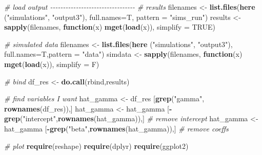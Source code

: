 \documentclass[
]{article}
\newenvironment{Shaded}{\begin{snugshade}}{\end{snugshade}}
\newcommand{\AttributeTok}[1]{\textcolor[rgb]{0.13,0.29,0.53}{#1}}
\newcommand{\CommentTok}[1]{\textcolor[rgb]{0.56,0.35,0.01}{\textit{#1}}}
\newcommand{\ConstantTok}[1]{\textcolor[rgb]{0.56,0.35,0.01}{#1}}
\newcommand{\ControlFlowTok}[1]{\textcolor[rgb]{0.13,0.29,0.53}{\textbf{#1}}}
\newcommand{\FunctionTok}[1]{\textcolor[rgb]{0.13,0.29,0.53}{\textbf{#1}}}
\newcommand{\NormalTok}[1]{#1}
\newcommand{\OtherTok}[1]{\textcolor[rgb]{0.56,0.35,0.01}{#1}}
\newcommand{\SpecialCharTok}[1]{\textcolor[rgb]{0.81,0.36,0.00}{\textbf{#1}}}
\newcommand{\StringTok}[1]{\textcolor[rgb]{0.31,0.60,0.02}{#1}}
\begin{document}
{\begin{Shaded}
\begin{Highlighting}[]
\CommentTok{\# load output {-}{-}{-}{-}{-}{-}{-}{-}{-}{-}{-}{-}{-}{-}{-}{-}{-}{-}{-}{-}{-}{-}{-}{-}{-}{-}{-}{-}{-}{-}{-}{-}{-}}
\CommentTok{\# results}
\NormalTok{filenames }\OtherTok{\textless{}{-}} \FunctionTok{list.files}\NormalTok{(}\FunctionTok{here}\NormalTok{ (}\StringTok{"simulations"}\NormalTok{, }\StringTok{"output3"}\NormalTok{), }\AttributeTok{full.names=}\NormalTok{T, }\AttributeTok{pattern =} \StringTok{"sims\_run"}\NormalTok{)}
\NormalTok{results }\OtherTok{\textless{}{-}} \FunctionTok{sapply}\NormalTok{(filenames, }\ControlFlowTok{function}\NormalTok{(x) }\FunctionTok{mget}\NormalTok{(}\FunctionTok{load}\NormalTok{(x)), }\AttributeTok{simplify =} \ConstantTok{TRUE}\NormalTok{)}

\CommentTok{\# simulated data}
\NormalTok{filenames }\OtherTok{\textless{}{-}} \FunctionTok{list.files}\NormalTok{(}\FunctionTok{here}\NormalTok{ (}\StringTok{"simulations"}\NormalTok{, }\StringTok{"output3"}\NormalTok{), }\AttributeTok{full.names=}\NormalTok{T,}\AttributeTok{pattern =} \StringTok{"data"}\NormalTok{)}
\NormalTok{simdata }\OtherTok{\textless{}{-}} \FunctionTok{sapply}\NormalTok{(filenames, }\ControlFlowTok{function}\NormalTok{(x) }\FunctionTok{mget}\NormalTok{(}\FunctionTok{load}\NormalTok{(x)), }\AttributeTok{simplify =}\NormalTok{ F)}

\CommentTok{\# bind}
\NormalTok{df\_res }\OtherTok{\textless{}{-}} \FunctionTok{do.call}\NormalTok{(rbind,results)}

\CommentTok{\# find variables I want}
\NormalTok{hat\_gamma }\OtherTok{\textless{}{-}}\NormalTok{ df\_res [}\FunctionTok{grep}\NormalTok{(}\StringTok{"gamma"}\NormalTok{, }\FunctionTok{rownames}\NormalTok{(df\_res)),]}
\NormalTok{hat\_gamma }\OtherTok{\textless{}{-}}\NormalTok{ hat\_gamma [}\SpecialCharTok{{-}}\FunctionTok{grep}\NormalTok{(}\StringTok{"intercept"}\NormalTok{,}\FunctionTok{rownames}\NormalTok{(hat\_gamma)),] }\CommentTok{\# remove intercept}
\NormalTok{hat\_gamma }\OtherTok{\textless{}{-}}\NormalTok{ hat\_gamma [}\SpecialCharTok{{-}}\FunctionTok{grep}\NormalTok{(}\StringTok{"beta"}\NormalTok{,}\FunctionTok{rownames}\NormalTok{(hat\_gamma)),] }\CommentTok{\# remove coeffs}

\CommentTok{\# plot}
\FunctionTok{require}\NormalTok{(reshape)}
\FunctionTok{require}\NormalTok{(dplyr)}
\FunctionTok{require}\NormalTok{(ggplot2)}


\end{Highlighting}
\end{Shaded}}
\end{document}
